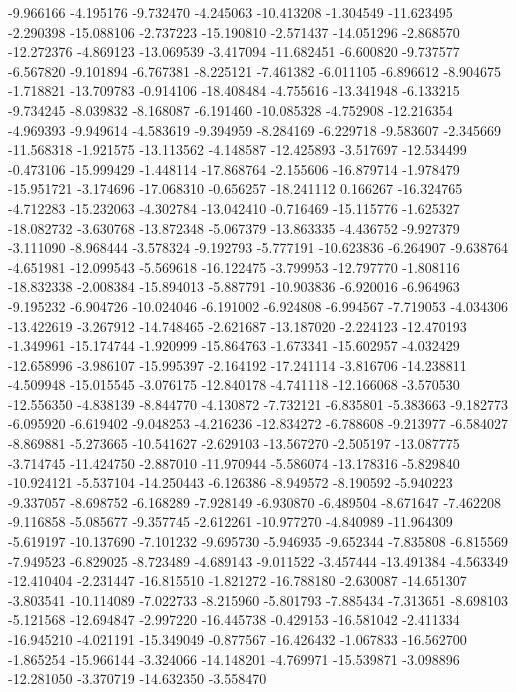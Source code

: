 -9.966166
-4.195176
-9.732470
-4.245063
-10.413208
-1.304549
-11.623495
-2.290398
-15.088106
-2.737223
-15.190810
-2.571437
-14.051296
-2.868570
-12.272376
-4.869123
-13.069539
-3.417094
-11.682451
-6.600820
-9.737577
-6.567820
-9.101894
-6.767381
-8.225121
-7.461382
-6.011105
-6.896612
-8.904675
-1.718821
-13.709783
-0.914106
-18.408484
-4.755616
-13.341948
-6.133215
-9.734245
-8.039832
-8.168087
-6.191460
-10.085328
-4.752908
-12.216354
-4.969393
-9.949614
-4.583619
-9.394959
-8.284169
-6.229718
-9.583607
-2.345669
-11.568318
-1.921575
-13.113562
-4.148587
-12.425893
-3.517697
-12.534499
-0.473106
-15.999429
-1.448114
-17.868764
-2.155606
-16.879714
-1.978479
-15.951721
-3.174696
-17.068310
-0.656257
-18.241112
0.166267
-16.324765
-4.712283
-15.232063
-4.302784
-13.042410
-0.716469
-15.115776
-1.625327
-18.082732
-3.630768
-13.872348
-5.067379
-13.863335
-4.436752
-9.927379
-3.111090
-8.968444
-3.578324
-9.192793
-5.777191
-10.623836
-6.264907
-9.638764
-4.651981
-12.099543
-5.569618
-16.122475
-3.799953
-12.797770
-1.808116
-18.832338
-2.008384
-15.894013
-5.887791
-10.903836
-6.920016
-6.964963
-9.195232
-6.904726
-10.024046
-6.191002
-6.924808
-6.994567
-7.719053
-4.034306
-13.422619
-3.267912
-14.748465
-2.621687
-13.187020
-2.224123
-12.470193
-1.349961
-15.174744
-1.920999
-15.864763
-1.673341
-15.602957
-4.032429
-12.658996
-3.986107
-15.995397
-2.164192
-17.241114
-3.816706
-14.238811
-4.509948
-15.015545
-3.076175
-12.840178
-4.741118
-12.166068
-3.570530
-12.556350
-4.838139
-8.844770
-4.130872
-7.732121
-6.835801
-5.383663
-9.182773
-6.095920
-6.619402
-9.048253
-4.216236
-12.834272
-6.788608
-9.213977
-6.584027
-8.869881
-5.273665
-10.541627
-2.629103
-13.567270
-2.505197
-13.087775
-3.714745
-11.424750
-2.887010
-11.970944
-5.586074
-13.178316
-5.829840
-10.924121
-5.537104
-14.250443
-6.126386
-8.949572
-8.190592
-5.940223
-9.337057
-8.698752
-6.168289
-7.928149
-6.930870
-6.489504
-8.671647
-7.462208
-9.116858
-5.085677
-9.357745
-2.612261
-10.977270
-4.840989
-11.964309
-5.619197
-10.137690
-7.101232
-9.695730
-5.946935
-9.652344
-7.835808
-6.815569
-7.949523
-6.829025
-8.723489
-4.689143
-9.011522
-3.457444
-13.491384
-4.563349
-12.410404
-2.231447
-16.815510
-1.821272
-16.788180
-2.630087
-14.651307
-3.803541
-10.114089
-7.022733
-8.215960
-5.801793
-7.885434
-7.313651
-8.698103
-5.121568
-12.694847
-2.997220
-16.445738
-0.429153
-16.581042
-2.411334
-16.945210
-4.021191
-15.349049
-0.877567
-16.426432
-1.067833
-16.562700
-1.865254
-15.966144
-3.324066
-14.148201
-4.769971
-15.539871
-3.098896
-12.281050
-3.370719
-14.632350
-3.558470
